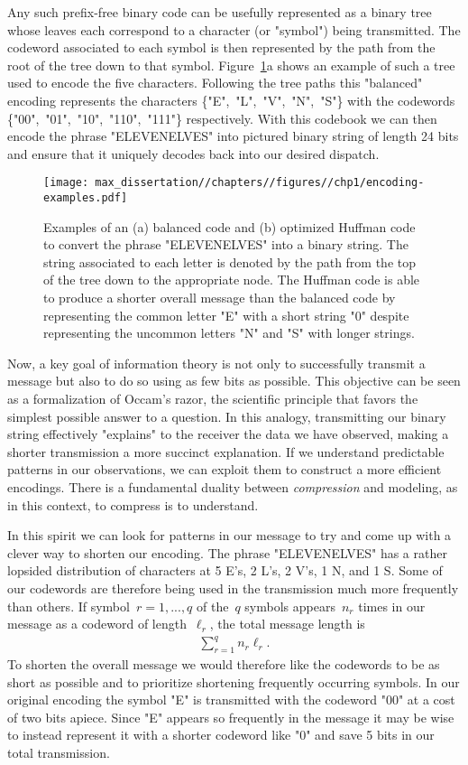 Any such prefix-free binary code can be usefully represented as a binary tree whose leaves each correspond to a character (or "symbol") being transmitted. The codeword associated to each symbol is then represented by the path from the root of the tree down to that symbol. Figure~\ref{fig:encoding-examples}a shows an example of such a tree used to encode the five characters. Following the tree paths this "balanced" encoding represents the characters \{"E",~"L",~"V",~"N",~"S"\} with the codewords \{"00",~"01",~"10",~"110",~"111"\} respectively. With this codebook we can then encode the phrase "ELEVENELVES" into pictured binary string of length 24 bits and ensure that it uniquely decodes back into our desired dispatch.

\begin{figure}
    \centering
    \texttt{[image: max\_dissertation//chapters//figures//chp1/encoding-examples.pdf]}
    \caption{Examples of an (a) balanced code and (b) optimized Huffman code to convert the phrase "ELEVENELVES" into a binary string. The string associated to each letter is denoted by the path from the top of the tree down to the appropriate node. The Huffman code is able to produce a shorter overall message than the balanced code by representing the common letter "E" with a short string "0" despite representing the uncommon letters "N" and "S" with longer strings.}
    \label{fig:encoding-examples}
\end{figure}

Now, a key goal of information theory is not only to successfully transmit a message but also to do so using as few bits as possible. This objective can be seen as a formalization of Occam's razor, the scientific principle that favors the simplest possible answer to a question. In this analogy, transmitting our binary string effectively "explains" to the receiver the data we have observed, making a shorter transmission a more succinct explanation. If we understand predictable patterns in our observations, we can exploit them to construct a more efficient encodings. There is a fundamental duality between \emph{compression} and modeling, as in this context, to compress is to understand. 

In this spirit we can look for patterns in our message to try and come up with a clever way to shorten our encoding. The phrase "ELEVENELVES" has a rather lopsided distribution of characters at 5 E's, 2 L's, 2 V's, 1 N, and 1 S. Some of our codewords are therefore being used in the transmission much more frequently than others. If symbol~$r = 1,...,q$ of the~$q$ symbols appears~$n_r$ times in our message as a codeword of length~$\ell_r$, the total message length is \begin{align}
    \sum_{r=1}^q n_r \ell_r. \label{eq:message-length}
\end{align}
To shorten the overall message we would therefore like the codewords to be as short as possible and to prioritize shortening frequently occurring symbols. In our original encoding the symbol "E" is transmitted with the codeword "00" at a cost of two bits apiece. Since "E" appears so frequently in the message it may be wise to instead represent it with a shorter codeword like "0" and save 5 bits in our total transmission. 

